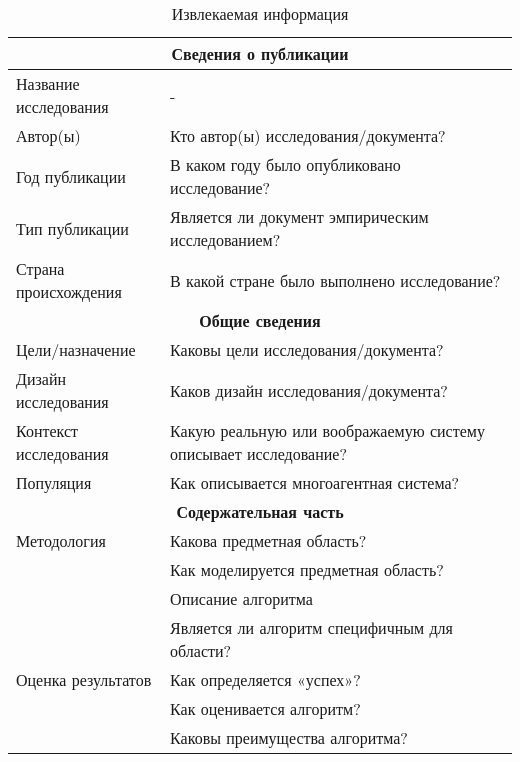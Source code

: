\begin{table}[h!]
  \centering
  \begin{footnotesize}
  \caption{Извлекаемая информация}
  \label{tab:questions}
  \renewcommand{\arraystretch}{1.3}
  \begin{tabular}{|p{5cm}|p{9cm}|}
    \hline
    \multicolumn{2}{|c|}{\textbf{Сведения о публикации}} \\
    \hline
    Название исследования & - \\
    \hline
    Автор(ы) & Кто автор(ы) исследования/документа? \\
    \hline
    Год публикации & В каком году было опубликовано исследование? \\
    \hline
    Тип публикации & Является ли документ эмпирическим исследованием? \\
    \hline
    Страна происхождения & В какой стране было выполнено исследование? \\
    \hline

    \multicolumn{2}{|c|}{\textbf{Общие сведения}} \\
    \hline
    Цели/назначение & Каковы цели исследования/документа? \\
    \hline
    Дизайн исследования & Каков дизайн исследования/документа? \\
    \hline
    Контекст исследования & Какую реальную или воображаемую систему описывает исследование? \\
    \hline
    Популяция & Как описывается многоагентная система? \\
    \hline

    \multicolumn{2}{|c|}{\textbf{Содержательная часть}} \\
    \hline
    Методология & Какова предметная область? \\
    \cline{2-2}
     & Как моделируется предметная область? \\
    \cline{2-2}
     & Описание алгоритма \\
    \cline{2-2}
     & Является ли алгоритм специфичным для области? \\
    \hline
    Оценка результатов & Как определяется «успех»? \\
    \cline{2-2}
     & Как оценивается алгоритм? \\
    \cline{2-2}
     & Каковы преимущества алгоритма? \\
    \hline
    \end{tabular}
  \end{footnotesize}
\end{table}

